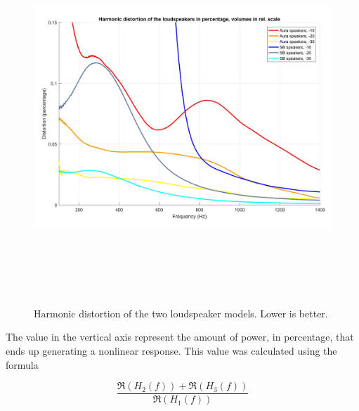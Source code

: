 \begin{figure}[H]
\centering
\includegraphics[width=14cm,height=14cm,keepaspectratio]{Figures/harmonicdistortion}
\decoRule
\caption[Harmonic distortion of the two loudspeaker models.]{Harmonic distortion of the two loudspeaker models. Lower is better.}
\label{fig:harmonicdistortion}
\end{figure}

The value in the vertical axis represent the amount of power, in percentage, that ends up generating a nonlinear response. This value was calculated using the formula

\[\frac{\Re\left(H_2(f)\right) + \Re\left(H_3(f)\right)}{\Re\left(H_1(f)\right)}\]

